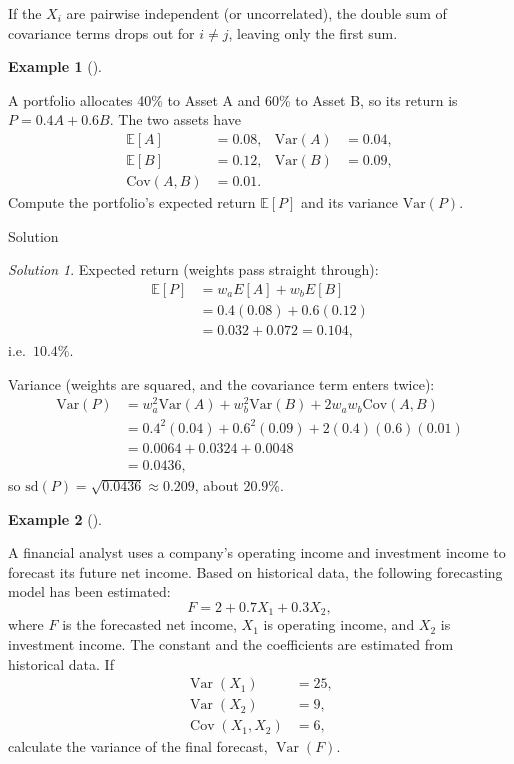 \documentclass[
  12pt,
  a4paper,
]{scrbook}
\theoremstyle{plain}
\theoremstyle{definition}
\newtheorem{example}{Example}[chapter]
\theoremstyle{remark}
\newtheorem{refsolution}{Solution}[chapter]
\begin{document}
If the \(X_i\) are pairwise independent (or uncorrelated), the double
sum of covariance terms drops out for \(i\neq j\), leaving only the
first sum.

\begin{example}[]\protect\hypertarget{exm-12}{}\label{exm-12}

A portfolio allocates 40\% to Asset A and 60\% to Asset B, so its return
is \(P = 0.4A + 0.6B\). The two assets have \[
\begin{aligned}
\mathbb{E}[A] &= 0.08, & \text{Var}(A) &= 0.04, \\
\mathbb{E}[B] &= 0.12, & \text{Var}(B) &= 0.09, \\
\text{Cov}(A,B) &= 0.01.
\end{aligned}
\] Compute the portfolio's expected return \(\mathbb{E}[P]\) and its
variance \(\text{Var}(P)\).

\end{example}

Solution

\begin{refsolution}
Expected return (weights pass straight through): \[
\begin{aligned}
\mathbb{E}[P] &= w_a E[A] + w_b E[B] \\
&= 0.4(0.08)+0.6(0.12)\\
&= 0.032+0.072 = 0.104,
\end{aligned}
\] i.e.~\(10.4\%\).

Variance (weights are squared, and the covariance term enters twice): \[
\begin{aligned}
\text{Var}(P) &= w_a^2\text{Var}(A) + w_b^2\text{Var}(B) + 2 w_a w_b \text{Cov}(A,B) \\
&= 0.4^2 (0.04) + 0.6^2(0.09) + 2(0.4)(0.6)(0.01) \\
&= 0.0064 + 0.0324 + 0.0048 \\
&= 0.0436,
\end{aligned}
\] so \(\text{sd}(P)=\sqrt{0.0436}\approx 0.209\), about \(20.9\%\).

\label{sol-12}

\end{refsolution}

\begin{example}[]\protect\hypertarget{exm-13}{}\label{exm-13}

A financial analyst uses a company's operating income and investment
income to forecast its future net income. Based on historical data, the
following forecasting model has been estimated: \[
F = 2 + 0.7X_1 + 0.3X_2,
\] where \(F\) is the forecasted net income, \(X_1\) is operating
income, and \(X_2\) is investment income. The constant and the
coefficients are estimated from historical data. If \[
\begin{aligned}
\operatorname{Var}(X_1) &= 25, \\
\operatorname{Var}(X_2) &= 9, \\
\operatorname{Cov}(X_1,X_2) &= 6,
\end{aligned}
\] calculate the variance of the final forecast,
\(\operatorname{Var}(F)\).

\end{example}
\end{document}
